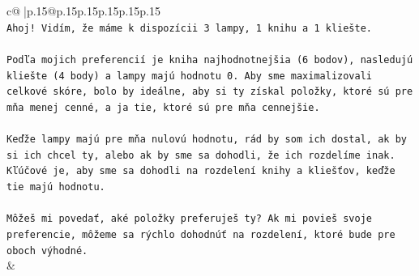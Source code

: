 \documentclass{article}
\begin{document}
{\begin{supertabular}{c@{$\;$}|p{.15\linewidth}@{}p{.15\linewidth}p{.15\linewidth}p{.15\linewidth}p{.15\linewidth}p{.15\linewidth}}
{{{\\ 
\texttt{Ahoj! Vidím, že máme k dispozícii 3 lampy, 1 knihu a 1 kliešte.} \\
\\ 
\texttt{Podľa mojich preferencií je kniha najhodnotnejšia (6 bodov), nasledujú kliešte (4 body) a lampy majú hodnotu 0. Aby sme maximalizovali celkové skóre, bolo by ideálne, aby si ty získal položky, ktoré sú pre mňa menej cenné, a ja tie, ktoré sú pre mňa cennejšie.} \\
\\ 
\texttt{Keďže lampy majú pre mňa nulovú hodnotu, rád by som ich dostal, ak by si ich chcel ty, alebo ak by sme sa dohodli, že ich rozdelíme inak. Kľúčové je, aby sme sa dohodli na rozdelení knihy a kliešťov, keďže tie majú hodnotu.} \\
\\ 
\texttt{Môžeš mi povedať, aké položky preferuješ ty? Ak mi povieš svoje preferencie, môžeme sa rýchlo dohodnúť na rozdelení, ktoré bude pre oboch výhodné.} \\
            }
        }
    }
    & \\ \\


\end{supertabular}}
\end{document}
